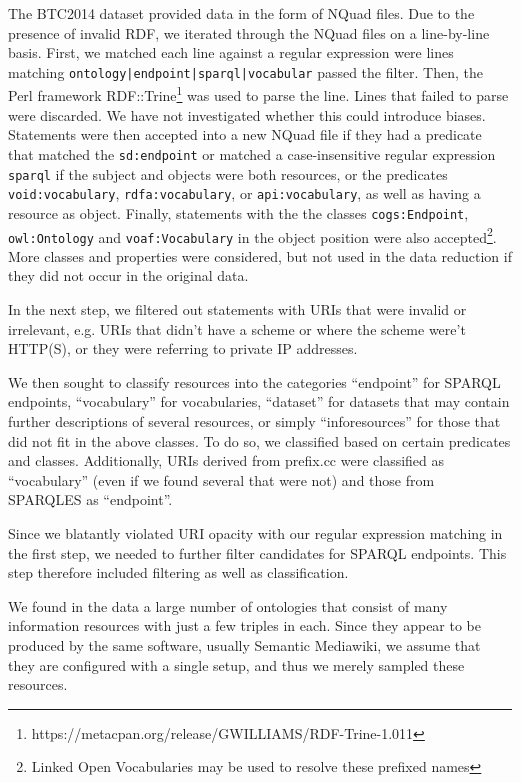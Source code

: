\documentclass{article}
\newcommand{\rdfterm}[1]{\texttt{#1}}
\begin{document}
The BTC2014 dataset provided data in the form of NQuad files. Due to
the presence of invalid RDF, we iterated through the NQuad files on a
line-by-line basis. First, we matched each line against a regular
expression were lines matching
\texttt{ontology|endpoint|sparql|vocabular} passed the filter. Then,
the Perl framework
RDF::Trine\footnote{https://metacpan.org/release/GWILLIAMS/RDF-Trine-1.011}
was used to parse the line. Lines that failed to parse were
discarded. We have not investigated whether this could introduce
biases. Statements were then accepted into a new NQuad file if they
had a predicate that matched the \rdfterm{sd:endpoint} or matched a
case-insensitive regular expression \texttt{sparql} if the subject and
objects were both resources, or the predicates
\rdfterm{void:vocabulary}, \rdfterm{rdfa:vocabulary}, or
\rdfterm{api:vocabulary}, as well as having a resource as
object. Finally, statements with the the classes
\rdfterm{cogs:Endpoint}, \rdfterm{owl:Ontology} and
\rdfterm{voaf:Vocabulary} in the object position were also
accepted\footnote{Linked Open Vocabularies \cite{lov2} may be used to
  resolve these prefixed names}. More classes and properties were
considered, but not used in the data reduction if they did not occur
in the original data.

In the next step, we filtered out statements with URIs that were
invalid or irrelevant, e.g. URIs that didn't have a scheme or where
the scheme were't HTTP(S), or they were referring to private IP addresses.

We then sought to classify resources into the categories ``endpoint''
for SPARQL endpoints, ``vocabulary'' for vocabularies, ``dataset'' for
datasets that may contain further descriptions of several resources,
or simply ``inforesources'' for those that did not fit in the above
classes. To do so, we classified based on certain predicates and
classes. Additionally, URIs derived from prefix.cc were classified as
``vocabulary'' (even if we found several that were not) and those from
SPARQLES as ``endpoint''.

Since we blatantly violated URI opacity with our regular expression
matching in the first step, we needed to further filter candidates for
SPARQL endpoints. This step therefore included filtering as well as
classification.

We found in the data a large number of ontologies that consist of many
information resources with just a few triples in each. Since they
appear to be produced by the same software, usually Semantic
Mediawiki, we assume that they are configured with a single setup, and
thus we merely sampled these resources.
\end{document}
